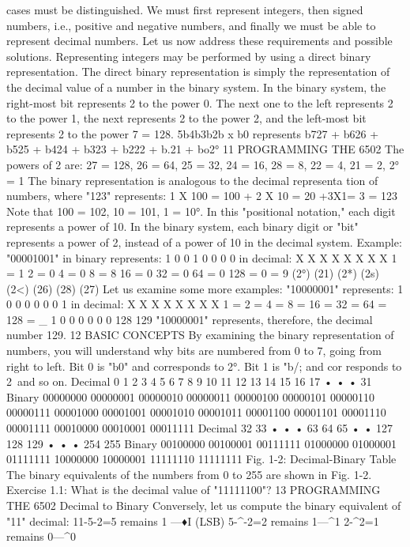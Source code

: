 cases must be distinguished. We must first represent integers, then
signed numbers, i.e., positive and negative numbers, and finally we
must be able to represent decimal numbers. Let us now address
these requirements and possible solutions.
Representing integers may be performed by using a direct
binary representation. The direct binary representation is simply
the representation of the decimal value of a number in the binary
system. In the binary system, the right-most bit represents 2 to
the power 0. The next one to the left represents 2 to the power 1,
the next represents 2 to the power 2, and the left-most bit
represents 2 to the power 7 = 128.
5b4b3b2b x b0
represents
b727 + b626 + b525 + b424 + b323 + b222 + b.21 + bo2°
11
PROGRAMMING THE 6502
The powers of 2 are:
27 = 128, 26 = 64, 25 = 32, 24 = 16, 28 = 8, 22 = 4, 21 = 2, 2° = 1
The binary representation is analogous to the decimal representa
tion of numbers, where "123" represents:
1 X 100 = 100
+ 2 X 10 = 20
+3X1= 3
= 123
Note that 100 = 102, 10 = 101, 1 = 10°.
In this "positional notation," each digit represents a power of 10.
In the binary system, each binary digit or "bit" represents a power
of 2, instead of a power of 10 in the decimal system.
Example: "00001001" in binary represents:
1
0
0
1
0
0
0
0
in decimal:
X
X
X
X
X
X
X
X
1 = 1
2 = 0
4 = 0
8 = 8
16 = 0
32 = 0
64 = 0
128 = 0
= 9
(2°)
(21)
(2*)
(2s)
(2<)
(26)
(28)
(27)
Let us examine some more examples:
"10000001" represents:
1
0
0
0
0
0
0
1
in decimal:
X
X
X
X
X
X
X
X
1 =
2 =
4 =
8 =
16 =
32 =
64 =
128 =
_
1
0
0
0
0
0
0
128
129
"10000001" represents, therefore, the decimal number 129.
12
BASIC CONCEPTS
By examining the binary representation of numbers, you will
understand why bits are numbered from 0 to 7, going from right to
left. Bit 0 is "b0" and corresponds to 2°. Bit 1 is "b/; and cor
responds to 2\ and so on.
Decimal
0
1
2
3
4
5
6
7
8
9
10
11
12
13
14
15
16
17
•
•
•
31
Binary
00000000
00000001
00000010
00000011
00000100
00000101
00000110
00000111
00001000
00001001
00001010
00001011
00001100
00001101
00001110
00001111
00010000
00010001
00011111
Decimal
32
33
•
•
•
63
64
65
•
•
127
128
129
•
•
•
254
255
Binary
00100000
00100001
00111111
01000000
01000001
01111111
10000000
10000001
11111110
11111111
Fig. 1-2: Decimal-Binary Table
The binary equivalents of the numbers from 0 to 255 are shown
in Fig. 1-2.
Exercise 1.1: What is the decimal value of "11111100"?
13
PROGRAMMING THE 6502
Decimal to Binary
Conversely, let us compute the binary equivalent of "11" decimal:
11-5-2=5 remains 1 —♦I (LSB)
5-^-2=2 remains 1—^1
2-^2=1 remains 0—^0
